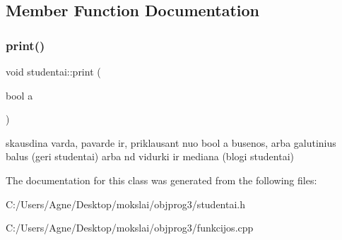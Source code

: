 \subsection{Member Function Documentation}
\mbox{\label{classstudentai_ac48600dd1f684ec6538c7797e7463690}} 
\subsubsection{\texorpdfstring{print()}{print()}}
{\footnotesize\ttfamily void studentai\+::print (\begin{DoxyParamCaption}\item[{bool}]{a }\end{DoxyParamCaption})}

skausdina varda, pavarde ir, priklausant nuo bool a busenos, arba galutinius balus (geri studentai) arba nd vidurki ir mediana (blogi studentai) 

The documentation for this class was generated from the following files\+:\begin{DoxyCompactItemize}
\item 
C\+:/\+Users/\+Agne/\+Desktop/mokslai/objprog3/studentai.\+h\item 
C\+:/\+Users/\+Agne/\+Desktop/mokslai/objprog3/funkcijos.\+cpp\end{DoxyCompactItemize}
